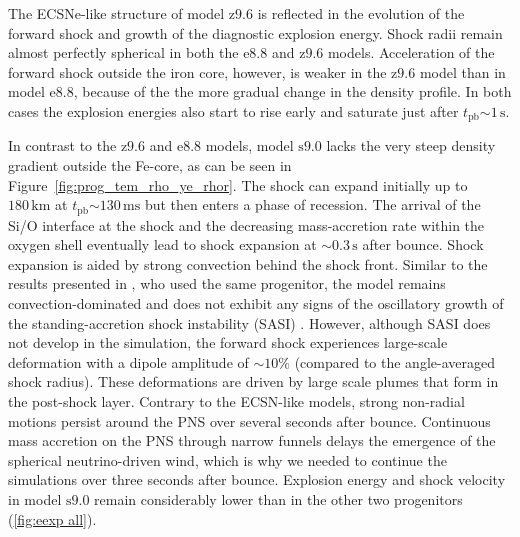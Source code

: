 \documentclass[fleqn,usenatbib]{mnras}
\newcommand{\tpb}{\ensuremath{t_{\text{pb}}}}
\newcommand{\km}{\ensuremath{\mathrm{km}}}
\newcommand{\s}{\ensuremath{\text{s}}}
\newcommand{\ms}{\ensuremath{\text{ms}}}
\newcommand{\onemg}{\ensuremath{\mathrm{e8.8}}\xspace}
\newcommand{\snine}{\ensuremath{\mathrm{s9.0}}\xspace}
\newcommand{\znine}{\ensuremath{\mathrm{z9.6}}\xspace}
\begin{document}
The ECSNe-like structure of model \znine is reflected in the 
evolution of the forward shock and growth of the diagnostic explosion energy. 
Shock radii remain almost perfectly spherical in both the \onemg and \znine models. 
Acceleration of the forward shock outside the iron core, however, is weaker in the 
\znine model than in model \onemg, because of the the more gradual change in the density profile. 
In both cases the explosion energies also start to rise early and saturate just after $\tpb\mathord{\sim}1\,\s$.

In contrast to the \znine and \onemg models, model \snine lacks
the very steep density gradient outside the Fe-core, as can be 
seen in Figure~\ref{fig:prog_tem_rho_ye_rhor}.
The shock can expand initially up to $180\,\km$ at $\tpb\mathord{\sim}130\,\ms$ but then 
enters a phase of recession. The arrival of the Si/O interface at the shock and 
the decreasing mass-accretion rate within the oxygen shell eventually lead to shock 
expansion at $\mathord{\sim}0.3\,\s$ after bounce. Shock expansion is aided by strong 
convection behind the shock front. Similar to the results presented in \cite{Glas2019}, 
who used the same progenitor, the model remains convection-dominated and does not 
exhibit any signs of the oscillatory growth of the standing-accretion 
shock instability (SASI) \citep{Blondin2003,Foglizzo2007}.
However, although SASI does not develop in the simulation, the forward shock experiences 
large-scale deformation with a dipole amplitude of $\mathord{\sim}10\%$ 
(compared to the angle-averaged shock radius). These deformations are driven by 
large scale plumes that form in the post-shock layer. 
Contrary to the ECSN-like models, strong non-radial motions 
persist around the PNS over several seconds after bounce. Continuous mass accretion 
on the PNS through narrow funnels delays the emergence of the spherical 
neutrino-driven wind, which is why we needed to continue the simulations 
over three seconds after bounce.
Explosion energy and shock velocity in model \snine remain considerably lower
than in the other two progenitors (\ref{fig:eexp all}).
\end{document}
